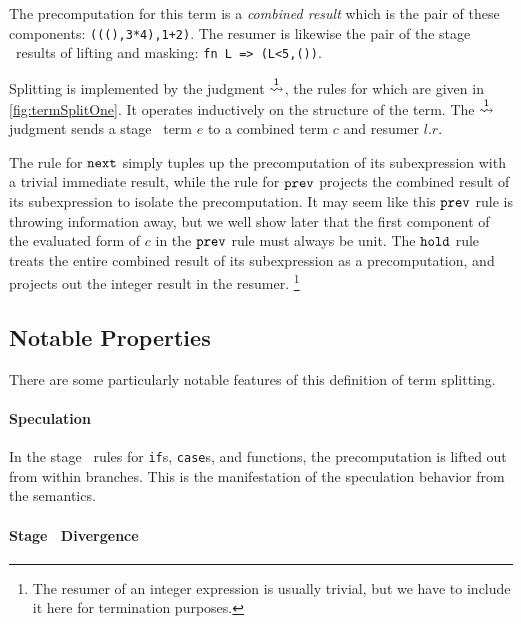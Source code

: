 The precomputation for this term is a \emph{combined result} which is
the pair of these components: \verb|(((),3*4),1+2)|. The resumer is
likewise the pair of the stage \bbtwo\ results of lifting and masking:
\verb|fn L => (L<5,())|.

Splitting is implemented by the judgment $\overset{ 1}\rightsquigarrow$,
the rules for which are given in \cref{fig:termSplitOne}.  
It operates inductively on the structure of the term.  
The $\overset{ 1}\rightsquigarrow$ judgment sends a stage \bbone\ term $e$ to a combined term
$c$ and resumer $l.r$. 

The rule for ${\tt next}$ simply tuples up the precomputation of its subexpression with a trivial immediate result,
while the rule for ${\tt prev}$ projects the combined result of its subexpression to isolate the precomputation.
It may seem like this ${\tt prev}$ rule is throwing information away, but we well show later that the first component 
of the evaluated form of $c$ in the ${\tt prev}$ rule must always be unit.
The ${\tt hold}$ rule treats the entire combined result of its subexpression as a precomputation, 
and projects out the integer result in the resumer.%
\footnote{The resumer of an integer expression is usually trivial, 
but we have to include it here for termination purposes.}

\subsection {Notable Properties}


There are some particularly notable features of this definition of term
splitting.

\paragraph {Speculation}

In the stage \bbtwo\ rules for {\tt if}s, {\tt case}s, and functions, the
precomputation is lifted out from within branches. This is the manifestation of
the speculation behavior from the semantics.

\paragraph {Stage \bbone\ Divergence}

